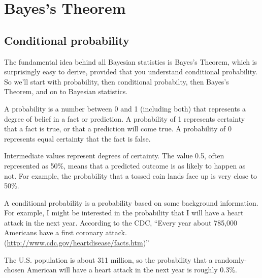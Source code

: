 \documentclass[12pt]{book}
\begin{document}
\normalsize

\clearemptydoublepage

\begin{latexonly}

\tableofcontents

\clearemptydoublepage

\end{latexonly}

\mainmatter

\newcommand{\p}[1]{\ensuremath{\mathrm{p}(#1)}}
\newcommand{\T}[1]{\mbox{#1}}
\newcommand{\AND}{~\mathrm{and}~}
\newcommand{\NOT}{\mathrm{not}~}


\chapter{Bayes's Theorem}
\label{intro}

\section{Conditional probability}

The fundamental idea behind all Bayesian statistics is Bayes's Theorem,
which is surprisingly easy to derive, provided that you understand
conditional probability.  So we'll start with probability, then
conditional probabilty, then Bayes's Theorem, and on to Bayesian
statistics.

A probability is a number between 0 and 1 (including both) that
represents a degree of belief in a fact or prediction.  A probability
of 1 represents certainty that a fact is true, or that a prediction
will come true.  A probability of 0 represents equal certainty
that the fact is false.

Intermediate values represent degrees of certainty.  The value 0.5,
often represented as 50\%, means that a predicted outcome is
as likely to happen as not.  For example, the probability that a tossed
coin lands face up is very close to 50\%.

A conditional probability is a probability based on some background
information.  For example, I might be interested in the probability
that I will have a heart attack in the next year.  According to the
CDC, ``Every year about 785,000 Americans have a first coronary attack.
(\url{http://www.cdc.gov/heartdisease/facts.htm})''

The U.S. population is about 311 million, so the probability that a
randomly-chosen American will have a heart attack in the next year is
roughly 0.3\%.
\end{document}
